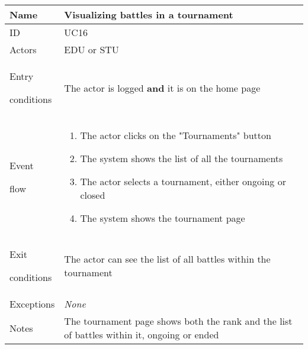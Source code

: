 \begin{center}
    \def\arraystretch{1.5}
    \begin{tabular}{| m{2cm} | m{10cm}|}
        \hline
        Name                  & Visualizing battles in a tournament                                                         \\ \hline
        ID                    & UC16                                                                                        \\ \hline
        Actors                & EDU or STU                                                                                  \\ \hline
        Entry \par conditions & The actor is logged \textbf{and} it is on the home page                                     \\ \hline
        Event \par flow       & \begin{enumerate}
                                    \item The actor clicks on the "Tournaments" button
                                    \item The system shows the list of all the tournaments
                                    \item The actor selects a tournament, either ongoing or closed
                                    \item The system shows the tournament page
                                \end{enumerate}                               \\ \hline
        Exit \par conditions  & The actor can see the list of all battles within the tournament                             \\ \hline
        Exceptions            & \textit{None}                                                                               \\ \hline
        Notes                 & The tournament page shows both the rank and the list of battles within it, ongoing or ended \\ \hline
    \end{tabular}
\end{center}


